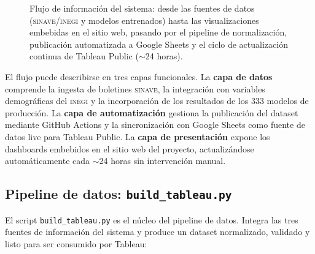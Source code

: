 \documentclass[12pt, letterpaper]{article}
\begin{document}
\begin{figure}[H]
{
}
\caption[Flujo de información del sistema Tableau.]{%
Flujo de información del sistema: desde las fuentes de datos (\textsc{sinave}/\textsc{inegi}
y modelos entrenados) hasta las visualizaciones embebidas en el sitio web,
pasando por el pipeline de normalización, publicación automatizada a Google
Sheets y el ciclo de actualización continua de Tableau Public ($\sim$24 horas).}
\label{fig:flujo_tableau}
\end{figure}

El flujo puede describirse en tres capas funcionales. La \textbf{capa de datos} comprende la ingesta de boletines \textsc{sinave}, la integración con variables demográficas del \textsc{inegi} y la incorporación de los resultados de los 333 modelos de producción. La \textbf{capa de automatización} gestiona la publicación del dataset mediante GitHub Actions y la sincronización con Google Sheets como fuente de datos live para Tableau Public. La \textbf{capa de presentación} expone los dashboards embebidos en el sitio web del proyecto, actualizándose automáticamente cada $\sim$24 horas sin intervención manual.

\newpage
\subsection{Pipeline de datos: \texttt{build\_tableau.py}}\label{subsec:pipeline_tableau}

El script \texttt{build\_tableau.py} es el núcleo del pipeline de datos. Integra las tres fuentes de información del sistema y produce un dataset normalizado, validado y listo para ser consumido por Tableau:
\end{document}
